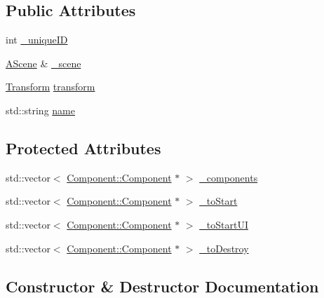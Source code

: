 \subsection*{Public Attributes}
\begin{DoxyCompactItemize}
\item 
int \mbox{\hyperlink{class_beer_engine_1_1_game_object_a7520a234dc0f49d03deac22a6d4b8e19}{\+\_\+unique\+ID}}
\item 
\mbox{\hyperlink{class_beer_engine_1_1_a_scene}{A\+Scene}} \& \mbox{\hyperlink{class_beer_engine_1_1_game_object_ab987f198a11d307f0661672a9f57da1a}{\+\_\+scene}}
\item 
\mbox{\hyperlink{class_beer_engine_1_1_transform}{Transform}} \mbox{\hyperlink{class_beer_engine_1_1_game_object_ac17bf13885d36b7ae8b1164e1ec13a02}{transform}}
\item 
std\+::string \mbox{\hyperlink{class_beer_engine_1_1_game_object_a14a6872777d4a7be2c967a0169a7880a}{name}}
\end{DoxyCompactItemize}
\subsection*{Protected Attributes}
\begin{DoxyCompactItemize}
\item 
std\+::vector$<$ \mbox{\hyperlink{class_beer_engine_1_1_component_1_1_component}{Component\+::\+Component}} $\ast$ $>$ \mbox{\hyperlink{class_beer_engine_1_1_game_object_a068953c56e2d59b33077be6748a1a5c5}{\+\_\+components}}
\item 
std\+::vector$<$ \mbox{\hyperlink{class_beer_engine_1_1_component_1_1_component}{Component\+::\+Component}} $\ast$ $>$ \mbox{\hyperlink{class_beer_engine_1_1_game_object_aaaa5e7b81c4aeddd644e65afa5cc5f55}{\+\_\+to\+Start}}
\item 
std\+::vector$<$ \mbox{\hyperlink{class_beer_engine_1_1_component_1_1_component}{Component\+::\+Component}} $\ast$ $>$ \mbox{\hyperlink{class_beer_engine_1_1_game_object_a56b7077bd7769ce2130238b7ce2aad69}{\+\_\+to\+Start\+UI}}
\item 
std\+::vector$<$ \mbox{\hyperlink{class_beer_engine_1_1_component_1_1_component}{Component\+::\+Component}} $\ast$ $>$ \mbox{\hyperlink{class_beer_engine_1_1_game_object_af2ff6599a454c929d37745ff5afa050e}{\+\_\+to\+Destroy}}
\end{DoxyCompactItemize}


\subsection{Constructor \& Destructor Documentation}
\mbox{\label{class_beer_engine_1_1_game_object_a4b23814e19c3dabc407594419d396a41}} 
